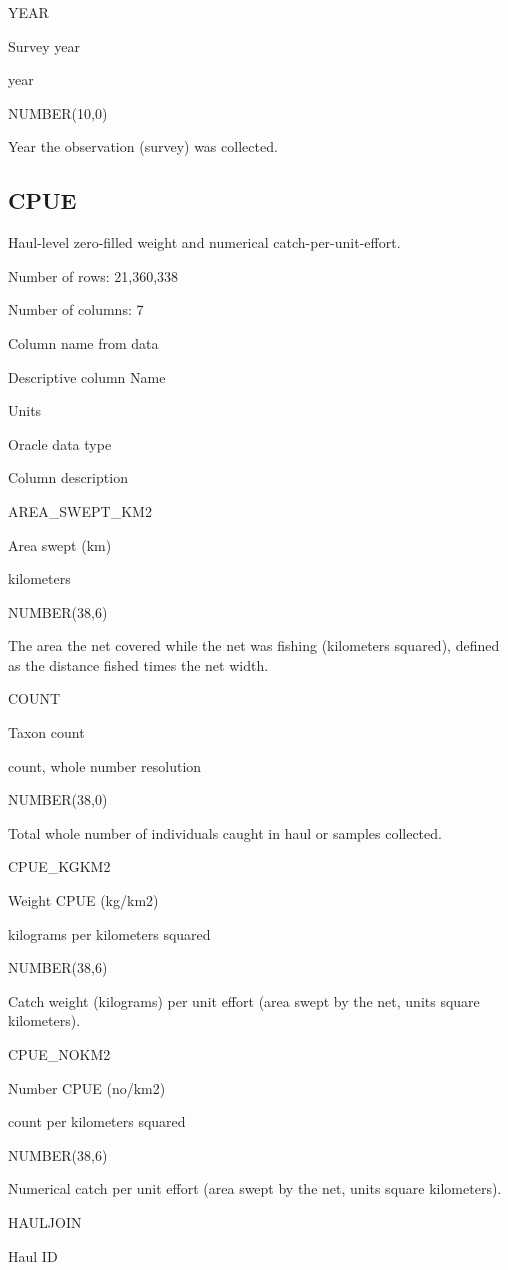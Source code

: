 \documentclass[
  letterpaper,
  oneside,
  open=any]{scrbook}
\begin{document}
YEAR

Survey year

year

NUMBER(10,0)

Year the observation (survey) was collected.

\hypertarget{cpue}{%
\subsection{CPUE}\label{cpue}}

Haul-level zero-filled weight and numerical catch-per-unit-effort.

Number of rows: 21,360,338

Number of columns: 7

Column name from data

Descriptive column Name

Units

Oracle data type

Column description

AREA\_SWEPT\_KM2

Area swept (km)

kilometers

NUMBER(38,6)

The area the net covered while the net was fishing (kilometers squared),
defined as the distance fished times the net width.

COUNT

Taxon count

count, whole number resolution

NUMBER(38,0)

Total whole number of individuals caught in haul or samples collected.

CPUE\_KGKM2

Weight CPUE (kg/km2)

kilograms per kilometers squared

NUMBER(38,6)

Catch weight (kilograms) per unit effort (area swept by the net, units
square kilometers).

CPUE\_NOKM2

Number CPUE (no/km2)

count per kilometers squared

NUMBER(38,6)

Numerical catch per unit effort (area swept by the net, units square
kilometers).

HAULJOIN

Haul ID
\end{document}
